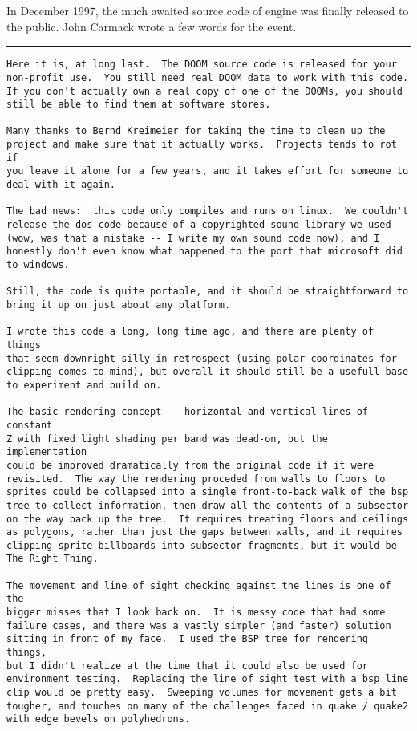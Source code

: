 In December 1997, the much awaited source code of \doom{} engine was finally released to the public. 
John Carmack wrote a few words for the event.\\
\par
\vspace{10pt}
\hrule \par
\begin{verbatim}
Here it is, at long last.  The DOOM source code is released for your
non-profit use.  You still need real DOOM data to work with this code.
If you don't actually own a real copy of one of the DOOMs, you should
still be able to find them at software stores.

Many thanks to Bernd Kreimeier for taking the time to clean up the
project and make sure that it actually works.  Projects tends to rot if
you leave it alone for a few years, and it takes effort for someone to
deal with it again.

The bad news:  this code only compiles and runs on linux.  We couldn't
release the dos code because of a copyrighted sound library we used
(wow, was that a mistake -- I write my own sound code now), and I
honestly don't even know what happened to the port that microsoft did
to windows.

Still, the code is quite portable, and it should be straightforward to
bring it up on just about any platform.

I wrote this code a long, long time ago, and there are plenty of things
that seem downright silly in retrospect (using polar coordinates for
clipping comes to mind), but overall it should still be a usefull base
to experiment and build on.

The basic rendering concept -- horizontal and vertical lines of constant
Z with fixed light shading per band was dead-on, but the implementation
could be improved dramatically from the original code if it were
revisited.  The way the rendering proceded from walls to floors to
sprites could be collapsed into a single front-to-back walk of the bsp
tree to collect information, then draw all the contents of a subsector
on the way back up the tree.  It requires treating floors and ceilings
as polygons, rather than just the gaps between walls, and it requires
clipping sprite billboards into subsector fragments, but it would be
The Right Thing.

The movement and line of sight checking against the lines is one of the
bigger misses that I look back on.  It is messy code that had some
failure cases, and there was a vastly simpler (and faster) solution
sitting in front of my face.  I used the BSP tree for rendering things,
but I didn't realize at the time that it could also be used for
environment testing.  Replacing the line of sight test with a bsp line
clip would be pretty easy.  Sweeping volumes for movement gets a bit
tougher, and touches on many of the challenges faced in quake / quake2
with edge bevels on polyhedrons.


\end{verbatim}
